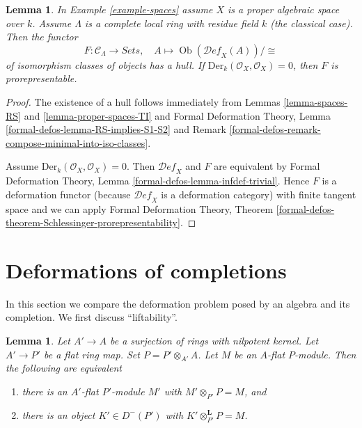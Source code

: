 \documentclass{stacks-project}
\theoremstyle{plain}
\newtheorem{lemma}[subsection]{Lemma}
\theoremstyle{definition}
\theoremstyle{remark}
\numberwithin{equation}{subsection}
\def\Ob{\mathop{\mathrm{Ob}}\nolimits}
\def\Deformationcategory{\mathcal{D}\!\mathit{ef}}
\begin{document}
\begin{lemma}
\label{lemma-spaces-hull}
In Example \ref{example-spaces} assume $X$ is a proper algebraic space over $k$.
Assume $\Lambda$ is a complete local ring with residue field $k$
(the classical case). Then the functor
$$
F : \mathcal{C}_\Lambda \longrightarrow \textit{Sets},\quad
A \longmapsto \Ob(\Deformationcategory_X(A))/\cong
$$
of isomorphism classes of objects has a hull. If
$\text{Der}_k(\mathcal{O}_X, \mathcal{O}_X) = 0$, then
$F$ is prorepresentable.
\end{lemma}

\begin{proof}
The existence of a hull follows immediately from
Lemmas \ref{lemma-spaces-RS} and \ref{lemma-proper-spaces-TI} and
Formal Deformation Theory, Lemma \ref{formal-defos-lemma-RS-implies-S1-S2}
and Remark \ref{formal-defos-remark-compose-minimal-into-iso-classes}.

\medskip\noindent
Assume $\text{Der}_k(\mathcal{O}_X, \mathcal{O}_X) = 0$. Then
$\Deformationcategory_X$ and $F$ are equivalent by
Formal Deformation Theory, Lemma \ref{formal-defos-lemma-infdef-trivial}.
Hence $F$ is a deformation functor (because $\Deformationcategory_X$ is a
deformation category) with finite tangent space and we can apply
Formal Deformation Theory, Theorem
\ref{formal-defos-theorem-Schlessinger-prorepresentability}.
\end{proof}





\section{Deformations of completions}
\label{section-compare}

\noindent
In this section we compare the deformation problem posed
by an algebra and its completion.
We first discuss ``liftability''.

\begin{lemma}
\label{lemma-lift-equivalence-module-derived}
Let $A' \to A$ be a surjection of rings with nilpotent kernel.
Let $A' \to P'$ be a flat ring map.
Set $P = P' \otimes_{A'} A$.
Let $M$ be an $A$-flat $P$-module.
Then the following are equivalent
\begin{enumerate}
\item there is an $A'$-flat $P'$-module $M'$ with
$M' \otimes_{P'} P = M$, and
\item there is an object $K' \in D^-(P')$ with
$K' \otimes_{P'}^\mathbf{L} P = M$.
\end{enumerate}
\end{lemma}
\end{document}
